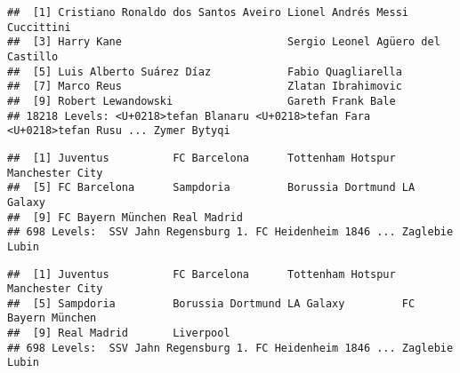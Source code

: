 \documentclass[
]{article}
\newenvironment{Shaded}{\begin{snugshade}}{\end{snugshade}}
\newcommand{\CommentTok}[1]{\textcolor[rgb]{0.56,0.35,0.01}{\textit{#1}}}
\newcommand{\DecValTok}[1]{\textcolor[rgb]{0.00,0.00,0.81}{#1}}
\newcommand{\KeywordTok}[1]{\textcolor[rgb]{0.13,0.29,0.53}{\textbf{#1}}}
\newcommand{\NormalTok}[1]{#1}
\newcommand{\OperatorTok}[1]{\textcolor[rgb]{0.81,0.36,0.00}{\textbf{#1}}}
\newcommand{\StringTok}[1]{\textcolor[rgb]{0.31,0.60,0.02}{#1}}
\begin{document}
\begin{verbatim}
##  [1] Cristiano Ronaldo dos Santos Aveiro Lionel Andrés Messi Cuccittini     
##  [3] Harry Kane                          Sergio Leonel Agüero del Castillo  
##  [5] Luis Alberto Suárez Díaz            Fabio Quagliarella                 
##  [7] Marco Reus                          Zlatan Ibrahimovic                 
##  [9] Robert Lewandowski                  Gareth Frank Bale                  
## 18218 Levels: <U+0218>tefan Blanaru <U+0218>tefan Fara <U+0218>tefan Rusu ... Zymer Bytyqi
\end{verbatim}

\begin{Shaded}
\end{Shaded}

\begin{verbatim}
##  [1] Juventus          FC Barcelona      Tottenham Hotspur Manchester City  
##  [5] FC Barcelona      Sampdoria         Borussia Dortmund LA Galaxy        
##  [9] FC Bayern München Real Madrid      
## 698 Levels:  SSV Jahn Regensburg 1. FC Heidenheim 1846 ... Zaglebie Lubin
\end{verbatim}

\begin{Shaded}
\end{Shaded}

\begin{verbatim}
##  [1] Juventus          FC Barcelona      Tottenham Hotspur Manchester City  
##  [5] Sampdoria         Borussia Dortmund LA Galaxy         FC Bayern München
##  [9] Real Madrid       Liverpool        
## 698 Levels:  SSV Jahn Regensburg 1. FC Heidenheim 1846 ... Zaglebie Lubin
\end{verbatim}

\begin{Shaded}
\end{Shaded}
\end{document}
